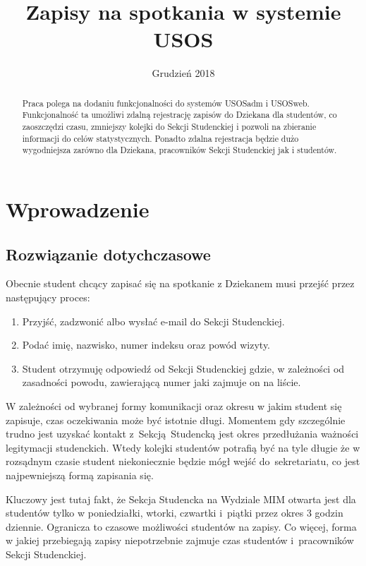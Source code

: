 \documentclass[licencjacka]{pracamgr}
\title{Zapisy na spotkania w systemie USOS}
\date{Grudzień 2018}
\begin{document}
\maketitle

\begin{abstract}
  Praca polega na dodaniu funkcjonalności do systemów USOSadm i USOSweb.
  Funkcjonalność ta umożliwi zdalną rejestrację zapisów do Dziekana dla studentów, co zaoszczędzi czasu, zmniejszy kolejki do Sekcji Studenckiej i pozwoli na zbieranie informacji do celów statystycznych.
  Ponadto zdalna rejestracja będzie dużo wygodniejsza zarówno dla Dziekana, pracowników Sekcji Studenckiej jak i studentów.
\end{abstract}

\tableofcontents

\chapter{Wprowadzenie}
\section{Rozwiązanie dotychczasowe}
Obecnie student chcący zapisać się na spotkanie z Dziekanem musi przejść przez następujący proces:
\begin{enumerate}
\item Przyjść, zadzwonić albo wysłać e-mail do Sekcji Studenckiej.
\item Podać imię, nazwisko, numer indeksu oraz powód wizyty.
\item Student otrzymuję odpowiedź od Sekcji Studenckiej gdzie, w zależności od zasadności powodu, zawierającą numer jaki zajmuje on na liście. 
\end{enumerate}
W zależności od wybranej formy komunikacji oraz okresu w jakim student się zapisuje, czas oczekiwania może być istotnie długi. Momentem gdy szczególnie trudno jest uzyskać kontakt z~Sekcją~Studencką jest okres przedłużania ważności legitymacji studenckich. Wtedy kolejki studentów potrafią być na tyle długie że w rozsądnym czasie student niekoniecznie będzie mógł wejść do~sekretariatu, co jest najpewniejszą formą zapisania się.

Kluczowy jest tutaj fakt, że Sekcja Studencka na Wydziale MIM otwarta jest dla studentów tylko w poniedziałki, wtorki, czwartki i~piątki przez okres 3 godzin dziennie. Ogranicza to czasowe możliwości studentów na zapisy. Co więcej, forma w jakiej przebiegają zapisy niepotrzebnie zajmuje czas studentów i~pracowników Sekcji Studenckiej.
\end{document}
